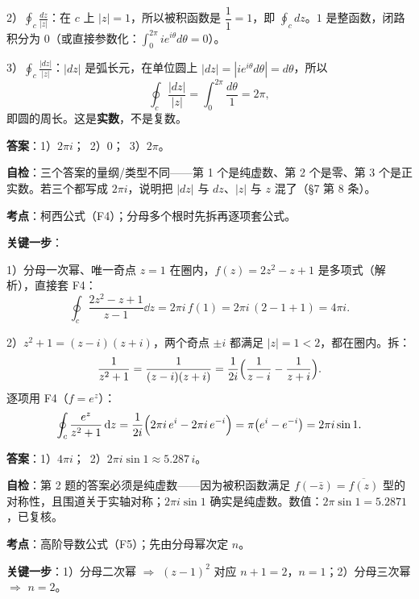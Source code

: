 \documentclass[11pt]{ctexart}
\let\origsubhdr\subhdr
\renewcommand{\subhdr}[1]{\par\needspace{4\baselineskip}\origsubhdr{#1}}
\renewcommand{\qbreak}{\needspace{0.45\textheight}}
\begin{document}
2）$\displaystyle\oint_c\frac{dz}{|z|}$：在 $c$ 上 $|z|=1$，所以被积函数是 $\dfrac{1}{1}=1$，即 $\displaystyle\oint_c dz$。$1$ 是整函数，闭路积分为 $0$（或直接参数化：$\int_0^{2\pi}ie^{i\theta}d\theta=0$）。

3）$\displaystyle\oint_c\frac{|dz|}{|z|}$：$|dz|$ 是弧长元，在单位圆上 $|dz|=|i e^{i\theta}d\theta|=d\theta$，所以
\[ \oint_c\frac{|dz|}{|z|}=\int_0^{2\pi}\frac{d\theta}{1}=2\pi , \]
即圆的周长。这是\textbf{实数}，不是复数。

\textbf{答案}：1）$2\pi i$；\ 2）$0$；\ 3）$2\pi$。

\textbf{自检}：三个答案的量纲/类型不同——第 1 个是纯虚数、第 2 个是零、第 3 个是正实数。若三个都写成 $2\pi i$，说明把 $|dz|$ 与 $dz$、$|z|$ 与 $z$ 混了（§7 第 8 条）。

\qbreak
{}
\label{app:hw3}

\textbf{考点}：柯西公式（F4）；分母多个根时先拆再逐项套公式。

\textbf{关键一步}：

1）分母一次幂、唯一奇点 $z=1$ 在圈内，$f(z)=2z^{2}-z+1$ 是多项式（解析），直接套 F4：
\[ \oint_c\frac{2z^{2}-z+1}{z-1}\dd z=2\pi i\,f(1)=2\pi i\,(2-1+1)=4\pi i . \]

2）$z^{2}+1=(z-i)(z+i)$，两个奇点 $\pm i$ 都满足 $|z|=1<2$，都在圈内。拆：
\[ \frac{1}{z^{2}+1}=\frac{1}{(z-i)(z+i)}=\frac{1}{2i}\Bigl(\frac{1}{z-i}-\frac{1}{z+i}\Bigr) . \]
逐项用 F4（$f=e^{z}$）：
\[ \oint_c\frac{e^{z}}{z^{2}+1}\,\mathrm{d} z=\frac{1}{2i}\Bigl(2\pi i\,e^{i}-2\pi i\,e^{-i}\Bigr)
=\pi\bigl(e^{i}-e^{-i}\bigr)=2\pi i\sin1 . \]

\textbf{答案}：1）$4\pi i$；\ 2）$2\pi i\sin1\approx5.287\,i$。

\textbf{自检}：第 2 题的答案必须是纯虚数——因为被积函数满足 $f(-\bar z)=\overline{f(z)}$ 型的对称性，且围道关于实轴对称；$2\pi i\sin1$ 确实是纯虚数。数值：$2\pi\sin1=5.2871$，已复核。

\qbreak
{}
\label{app:hw4}

\textbf{考点}：高阶导数公式（F5）；先由分母幂次定 $n$。

\textbf{关键一步}：1）分母二次幂 $\Rightarrow$ $(z-1)^{2}$ 对应 $n+1=2$，$n=1$；2）分母三次幂 $\Rightarrow$ $n=2$。
\end{document}
